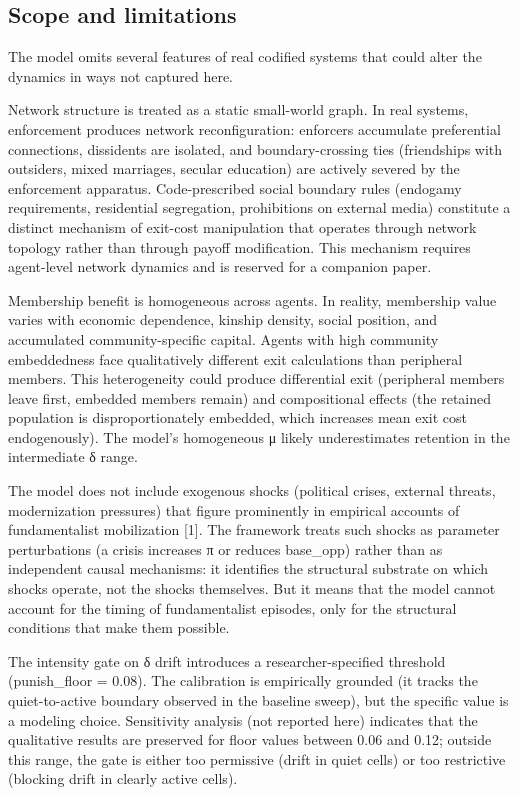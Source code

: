 \documentclass[12pt]{article}
\begin{document}
%
\subsection{Scope and limitations}

The model omits several features of real codified systems that could alter the dynamics in ways not captured here.

Network structure is treated as a static small-world graph. In real systems, enforcement produces network reconfiguration: enforcers accumulate preferential connections, dissidents are isolated, and boundary-crossing ties (friendships with outsiders, mixed marriages, secular education) are actively severed by the enforcement apparatus. Code-prescribed social boundary rules (endogamy requirements, residential segregation, prohibitions on external media) constitute a distinct mechanism of exit-cost manipulation that operates through network topology rather than through payoff modification. This mechanism requires agent-level network dynamics and is reserved for a companion paper.

Membership benefit is homogeneous across agents. In reality, membership value varies with economic dependence, kinship density, social position, and accumulated community-specific capital. Agents with high community embeddedness face qualitatively different exit calculations than peripheral members. This heterogeneity could produce differential exit (peripheral members leave first, embedded members remain) and compositional effects (the retained population is disproportionately embedded, which increases mean exit cost endogenously). The model's homogeneous μ likely underestimates retention in the intermediate δ range.

The model does not include exogenous shocks (political crises, external threats, modernization pressures) that figure prominently in empirical accounts of fundamentalist mobilization [1]. The framework treats such shocks as parameter perturbations (a crisis increases π or reduces base\_opp) rather than as independent causal mechanisms: it identifies the structural substrate on which shocks operate, not the shocks themselves. But it means that the model cannot account for the timing of fundamentalist episodes, only for the structural conditions that make them possible.

The intensity gate on δ drift introduces a researcher-specified threshold (punish\_floor = 0.08). The calibration is empirically grounded (it tracks the quiet-to-active boundary observed in the baseline sweep), but the specific value is a modeling choice. Sensitivity analysis (not reported here) indicates that the qualitative results are preserved for floor values between 0.06 and 0.12; outside this range, the gate is either too permissive (drift in quiet cells) or too restrictive (blocking drift in clearly active cells).
\end{document}
